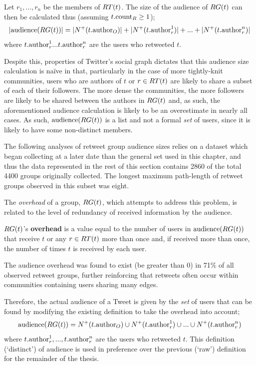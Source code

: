 Let $ r_1,...,r_n $ be the members of $RT(t)$. The size of the audience of $RG(t)$ can then be calculated thus (assuming $t.\textrm{count}_R \geq 1$);
\[
	|\textrm{audience}(RG(t))| = |N^+(t.\textrm{author}_O)| + |N^+(t.\textrm{author}_r^1)| + ... + |N^+(t.\textrm{author}_r^n)| 
\]
where $t.\textrm{author}_r^1 ... t.\textrm{author}_r^n$ are the users who retweeted $t$.

Despite this, properties of Twitter's social graph dictates that this audience size calculation is na{\"i}ve in that, particularly in the case of more tightly-knit communities, users who are authors of $t$ or $r \in RT(t)$ are likely to share a subset of each of their followers. The more dense the communities, the more followers are likely to be shared between the authors in $RG(t)$ and, as such, the aforementioned audience calculation is likely to be an overestimate in nearly all cases. As such, $\textrm{audience}(RG(t))$ is a list and not a formal \textit{set} of users, since it is likely to have some non-distinct members.

The following analyses of retweet group audience sizes relies on a dataset which began collecting at a later date than the general set used in this chapter, and thus the data represented in the rest of this section contains 2860 of the total 4400 groups originally collected. The longest maximum path-length of retweet groups observed in this subset was eight.

The \textit{overhead} of a group, $RG(t)$, which attempts to address this problem, is related to the level of redundancy of received information by the audience.

\begin{mydefinition}
    $RG(t)$'s \textbf{overhead} is a value equal to the number of users in $\textrm{audience}(RG(t))$ that receive $t$ or any $r \in RT(t)$ more than once and, if received more than once, the number of times $t$ is received by each user.
\end{mydefinition}

The audience overhead was found to exist (be greater than 0) in 71\% of all observed retweet groups, further reinforcing that retweets often occur within communities containing users sharing many edges.

Therefore, the actual audience of a Tweet is given by the \textit{set} of users that can be found by modifying the existing definition to take the overhead into account;
\[
	\textrm{audience}(RG(t)) = N^+(t.\textrm{author}_O) \cup N^+(t.\textrm{author}_r^1) \cup ... \cup N^+(t.\textrm{author}_r^n)
\]
where $t.\textrm{author}_r^1, ..., t.\textrm{author}_r^n$ are the users who retweeted $t$. This definition (`distinct') of audience is used in preference over the previous (`raw') definition for the remainder of the thesis.

